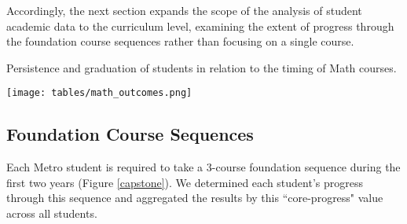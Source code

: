 \documentclass[conference]{IEEEtran}
\begin{document}
Accordingly, the next section expands the scope of the analysis of student academic data to the curriculum level, examining the extent of progress through the foundation course sequences rather than focusing on a single course.  

\begin{table}[htbp]
\caption{Persistence and graduation of students in relation to the timing of Math courses.}
\texttt{[image: tables/math\_outcomes.png]}
\label{table:math_outcomes}
\end{table}

\subsection{Foundation Course Sequences}

Each Metro student is required to take a 3-course foundation sequence during the first two years (Figure \ref{capstone}).  We determined each student's progress through this sequence and aggregated the results by this ``core-progress" value across all students.   
\end{document}
